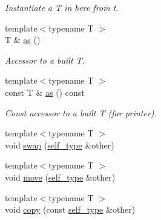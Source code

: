 \begin{DoxyCompactItemize}
\begin{DoxyCompactList}\small\item\em Instantiate a {\itshape T} in here from {\itshape t}. \end{DoxyCompactList}\item 
{\footnotesize template$<$typename T $>$ }\\T \& \hyperlink{structEquationParser_1_1variant_a42b14ef536da4960050a0db0d539dd5f}{as} ()\hypertarget{structEquationParser_1_1variant_a42b14ef536da4960050a0db0d539dd5f}{}\label{structEquationParser_1_1variant_a42b14ef536da4960050a0db0d539dd5f}

\begin{DoxyCompactList}\small\item\em Accessor to a built {\itshape T}. \end{DoxyCompactList}\item 
{\footnotesize template$<$typename T $>$ }\\const T \& \hyperlink{structEquationParser_1_1variant_af0e6dea306d2be91b6e12de6dd968e3b}{as} () const \hypertarget{structEquationParser_1_1variant_af0e6dea306d2be91b6e12de6dd968e3b}{}\label{structEquationParser_1_1variant_af0e6dea306d2be91b6e12de6dd968e3b}

\begin{DoxyCompactList}\small\item\em Const accessor to a built {\itshape T} (for printer). \end{DoxyCompactList}\item 
{\footnotesize template$<$typename T $>$ }\\void \hyperlink{structEquationParser_1_1variant_a7f5bd11f1d463f569efa8c2ca096f13e}{swap} (\hyperlink{structEquationParser_1_1variant_aa17a8f334ad949693cf8f6a8197092df}{self\+\_\+type} \&other)
\item 
{\footnotesize template$<$typename T $>$ }\\void \hyperlink{structEquationParser_1_1variant_ab995b43f5da5ebbf8e22b478610cc665}{move} (\hyperlink{structEquationParser_1_1variant_aa17a8f334ad949693cf8f6a8197092df}{self\+\_\+type} \&other)
\item 
{\footnotesize template$<$typename T $>$ }\\void \hyperlink{structEquationParser_1_1variant_a6a418207d721caaa7cb795f64da7769a}{copy} (const \hyperlink{structEquationParser_1_1variant_aa17a8f334ad949693cf8f6a8197092df}{self\+\_\+type} \&other)\hypertarget{structEquationParser_1_1variant_a6a418207d721caaa7cb795f64da7769a}{}\label{structEquationParser_1_1variant_a6a418207d721caaa7cb795f64da7769a}


\end{DoxyCompactItemize}
